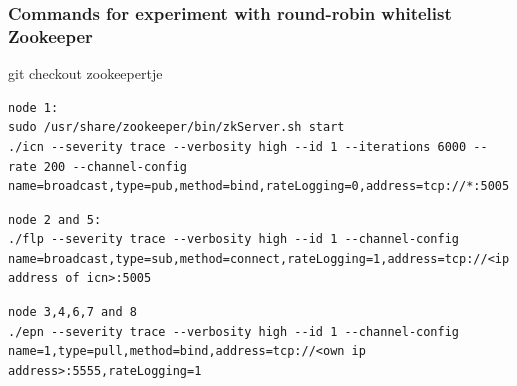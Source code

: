 \documentclass[]{article}
\begin{document}
\subsubsection{Commands for experiment with round-robin whitelist Zookeeper }
git checkout zookeepertje
\begin{lstlisting}
node 1:
sudo /usr/share/zookeeper/bin/zkServer.sh start
./icn --severity trace --verbosity high --id 1 --iterations 6000 --rate 200 --channel-config name=broadcast,type=pub,method=bind,rateLogging=0,address=tcp://*:5005
\end{lstlisting}

\begin{lstlisting}
node 2 and 5:
./flp --severity trace --verbosity high --id 1 --channel-config name=broadcast,type=sub,method=connect,rateLogging=1,address=tcp://<ip address of icn>:5005
\end{lstlisting}

\begin{lstlisting}
node 3,4,6,7 and 8
./epn --severity trace --verbosity high --id 1 --channel-config name=1,type=pull,method=bind,address=tcp://<own ip address>:5555,rateLogging=1
\end{lstlisting}
\end{document}
